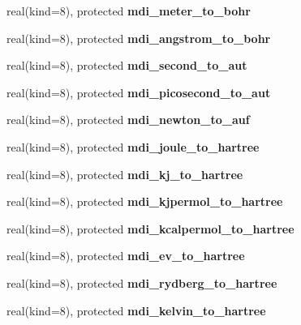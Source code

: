 \begin{DoxyCompactItemize}
\item 
\hypertarget{classmdi_af74f78803c251e23cd5022a8df7abc1e}{real(kind=8), protected {\bfseries mdi\-\_\-meter\-\_\-to\-\_\-bohr}}\label{classmdi_af74f78803c251e23cd5022a8df7abc1e}

\item 
\hypertarget{classmdi_a6abac217d729188855210e9327333578}{real(kind=8), protected {\bfseries mdi\-\_\-angstrom\-\_\-to\-\_\-bohr}}\label{classmdi_a6abac217d729188855210e9327333578}

\item 
\hypertarget{classmdi_a583e3421719bbf0bd951f455a0032766}{real(kind=8), protected {\bfseries mdi\-\_\-second\-\_\-to\-\_\-aut}}\label{classmdi_a583e3421719bbf0bd951f455a0032766}

\item 
\hypertarget{classmdi_ad350838a7aea84b6eca15da72d3ee4fc}{real(kind=8), protected {\bfseries mdi\-\_\-picosecond\-\_\-to\-\_\-aut}}\label{classmdi_ad350838a7aea84b6eca15da72d3ee4fc}

\item 
\hypertarget{classmdi_ace10d5db76cf54244d54b62e77b9d9a6}{real(kind=8), protected {\bfseries mdi\-\_\-newton\-\_\-to\-\_\-auf}}\label{classmdi_ace10d5db76cf54244d54b62e77b9d9a6}

\item 
\hypertarget{classmdi_a0b4e777d36fe90d506f70b16abb1b910}{real(kind=8), protected {\bfseries mdi\-\_\-joule\-\_\-to\-\_\-hartree}}\label{classmdi_a0b4e777d36fe90d506f70b16abb1b910}

\item 
\hypertarget{classmdi_a12a5c4e648f84d60dd261349d5e2cf37}{real(kind=8), protected {\bfseries mdi\-\_\-kj\-\_\-to\-\_\-hartree}}\label{classmdi_a12a5c4e648f84d60dd261349d5e2cf37}

\item 
\hypertarget{classmdi_a761336e719b236672a145cf86a8b7c95}{real(kind=8), protected {\bfseries mdi\-\_\-kjpermol\-\_\-to\-\_\-hartree}}\label{classmdi_a761336e719b236672a145cf86a8b7c95}

\item 
\hypertarget{classmdi_a2a5635f450c619dabb104846fd972b22}{real(kind=8), protected {\bfseries mdi\-\_\-kcalpermol\-\_\-to\-\_\-hartree}}\label{classmdi_a2a5635f450c619dabb104846fd972b22}

\item 
\hypertarget{classmdi_a02fe8f5658dc9d6379ceb2cc40b24b56}{real(kind=8), protected {\bfseries mdi\-\_\-ev\-\_\-to\-\_\-hartree}}\label{classmdi_a02fe8f5658dc9d6379ceb2cc40b24b56}

\item 
\hypertarget{classmdi_a4eefaa8b0fe9c708b1ba69ae86bac95c}{real(kind=8), protected {\bfseries mdi\-\_\-rydberg\-\_\-to\-\_\-hartree}}\label{classmdi_a4eefaa8b0fe9c708b1ba69ae86bac95c}

\item 
\hypertarget{classmdi_a5fc09af33b0b858f96014b3f9fdd7ee5}{real(kind=8), protected {\bfseries mdi\-\_\-kelvin\-\_\-to\-\_\-hartree}}\label{classmdi_a5fc09af33b0b858f96014b3f9fdd7ee5}

\end{DoxyCompactItemize}


